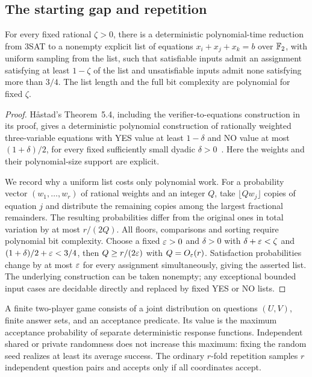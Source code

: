 \subsection{The starting gap and repetition}

\begin{theorem}\label{thm:max3lin}
For every fixed rational $\zeta>0$, there is a deterministic polynomial-time
reduction from $3$SAT to a nonempty explicit list of equations
$x_i+x_j+x_k=b$ over $\mathbb F_2$, with uniform sampling from the list, such that
satisfiable inputs admit an assignment satisfying at least $1-\zeta$ of the
list and unsatisfiable inputs admit none satisfying more than $3/4$.
The list length and the full bit complexity are polynomial for fixed $\zeta$.
\end{theorem}
\begin{proof}
H\aa stad's Theorem~5.4, including the verifier-to-equations construction in
its proof, gives a deterministic polynomial construction of rationally weighted
three-variable equations with YES value at least $1-\delta$ and NO value at
most $(1+\delta)/2$, for every fixed sufficiently small dyadic
$\delta>0$~\cite{Hastad2001}. Here the weights and their polynomial-size
support are explicit.

We record why a uniform list costs only polynomial work. For a probability
vector $(w_1,\ldots,w_r)$ of rational weights and an integer $Q$, take
$\lfloor Qw_j\rfloor$ copies of equation $j$ and distribute the remaining
copies among the largest fractional remainders. The resulting probabilities
differ from the original ones in total variation by at most $r/(2Q)$.
All floors, comparisons and sorting require polynomial bit complexity.
Choose a fixed $\varepsilon>0$ and $\delta>0$ with
$\delta+\varepsilon<\zeta$ and $(1+\delta)/2+\varepsilon<3/4$, then
$Q\ge r/(2\varepsilon)$ with $Q=O_\varepsilon(r)$. Satisfaction probabilities change by at
most $\varepsilon$ for every assignment simultaneously, giving the asserted list.
The underlying construction can be taken nonempty; any exceptional bounded
input cases are decidable directly and replaced by fixed YES or NO lists.
\end{proof}

A finite two-player game consists of a joint distribution on questions
$(U,V)$, finite answer sets, and an acceptance predicate. Its value is the
maximum acceptance probability of separate deterministic response functions.
Independent shared or private randomness does not increase this maximum:
fixing the random seed realizes at least its average success. The ordinary
$r$-fold repetition samples $r$ independent question pairs and accepts only
if all coordinates accept.

